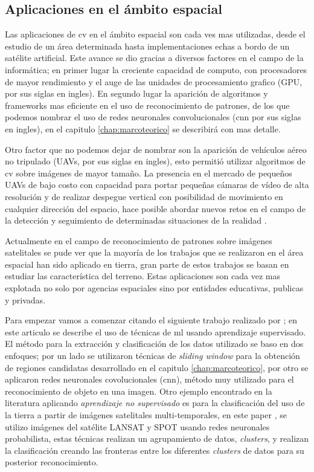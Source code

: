 \subsection{Aplicaciones en el ámbito espacial}\label{sub:estadodelacuestion}

Las aplicaciones de \ac{cv} en el ámbito espacial son cada ves mas utilizadas, desde el estudio de un área determinada hasta implementaciones echas a bordo de un satélite artificial. Este avance se dio gracias a diversos factores en el campo de la informática; en primer lugar la creciente capacidad de computo, con procesadores de mayor rendimiento y el auge de las unidades de procesamiento grafico (GPU, por sus siglas en ingles). En segundo lugar la aparición de algoritmos y frameworks mas eficiente en el uso de reconocimiento de patrones, de los que podemos nombrar el uso de redes neuronales convolucionales (\ac{cnn} por sus siglas en ingles), en el capitulo \ref{chap:marcoteorico} se describirá con mas detalle. 

Otro factor que no podemos dejar de nombrar son la aparición de vehículos aéreo no tripulado (UAVs, por sus siglas en ingles), esto permitió utilizar algoritmos de \ac{cv} sobre imágenes de mayor tamaño. La presencia en el mercado de pequeños UAVs de bajo costo con capacidad para portar pequeñas cámaras de vídeo de alta resolución y de realizar despegue vertical con posibilidad de movimiento en cualquier dirección del espacio, hace posible abordar nuevos retos en el campo de la detección y seguimiento de determinadas situaciones de la realidad \citep{Lanillos}.

Actualmente en el campo de reconocimiento de patrones sobre imágenes satelitales se pude ver que la mayoría de los trabajos que se realizaron en el área espacial han sido aplicado en tierra, gran parte de estos trabajos se basan en estudiar las característica del terreno. Estas aplicaciones son cada vez mas explotada no solo por agencias espaciales sino por entidades educativas, publicas y privadas. 

Para empezar vamos a comenzar citando el siguiente trabajo realizado por \citep{Cheang}; en este articulo se describe el uso de técnicas de \ac{ml} usando aprendizaje supervisado. El método para la extracción y clasificación de los datos utilizado se baso en dos enfoques; por un lado se utilizaron técnicas de \textit{sliding window}  \citep{sliding_windows}para la obtención de regiones candidatas desarrollado en el capitulo \ref{chap:marcoteorico}, por otro se aplicaron redes neuronales covolucionales (\ac{cnn}), método muy utilizado para el reconocimiento de objeto en una imagen. Otro ejemplo encontrado en la literatura aplicando  \textit{aprendizaje no supervisado} es para la clasificación del uso de la tierra a partir de imágenes satelitales multi-temporales, en este paper \citep{pnn}, se utilizo imágenes del satélite LANSAT y SPOT usando redes neuronales probabilista, estas técnicas realizan un agrupamiento de datos, \textit{clusters}, y realizan la clasificación creando las fronteras entre los diferentes \textit{clusters} de datos para su posterior reconocimiento.

